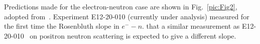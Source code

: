 Predictions made for the electron-neutron case are shown in Fig.~\ref{pic:Fig2}, adopted from~\cite{Blunden:2005ew}.
Experiment E12-20-010 (currently under analysis) measured for the first time the Rosenbluth slope in $e^--n$.
that a similar measurement as E12-20-010~\cite{ntpe} on positron neutron scattering is expected to give a different slope.

